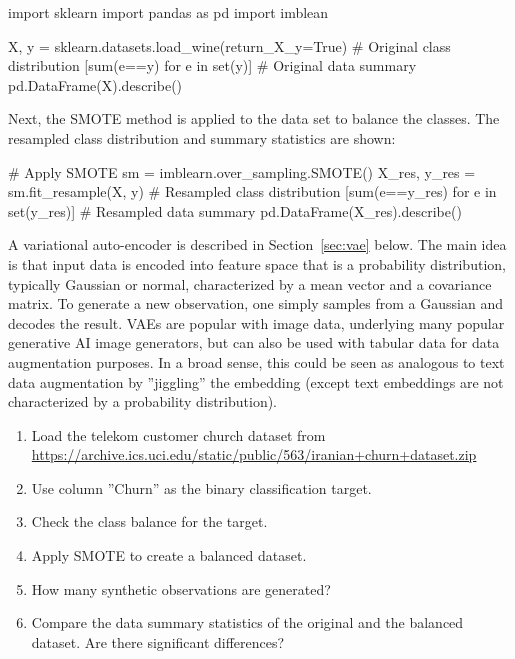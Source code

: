 \begin{pythoncode}
import sklearn
import pandas as pd
import imblean 

X, y = sklearn.datasets.load_wine(return_X_y=True)
# Original class distribution
[sum(e==y) for e in set(y)]
# Original data summary
pd.DataFrame(X).describe()
\end{pythoncode}

Next, the SMOTE method is applied to the data set to balance the classes. The resampled class distribution and summary statistics are shown:

\begin{pythoncode}
# Apply SMOTE
sm = imblearn.over_sampling.SMOTE()
X_res, y_res = sm.fit_resample(X, y)
# Resampled class distribution
[sum(e==y_res) for e in set(y_res)]
# Resampled data summary
pd.DataFrame(X_res).describe()
\end{pythoncode}

A variational auto-encoder is described in Section~\ref{sec:vae} below. The main idea is that input data is encoded into feature space that is a probability distribution, typically Gaussian or normal, characterized by a mean vector and a covariance matrix. To generate a new observation, one simply samples from a Gaussian and decodes the result. VAEs are popular with image data, underlying many popular generative AI image generators, but can also be used with tabular data for data augmentation purposes. In a broad sense, this could be seen as analogous to text data augmentation by ''jiggling'' the embedding (except text embeddings are not characterized by a probability distribution). 

\begin{exercisebox}
\begin{enumerate}
  \item Load the telekom customer church dataset from\\
  \url{https://archive.ics.uci.edu/static/public/563/iranian+churn+dataset.zip}
  \item Use column ''Churn'' as the binary classification target.
  \item Check the class balance for the target.
  \item Apply SMOTE to create a balanced dataset.
  \item How many synthetic observations are generated?
  \item Compare the data summary statistics of the original and the balanced dataset. Are there significant differences?
\end{enumerate}
\end{exercisebox}


